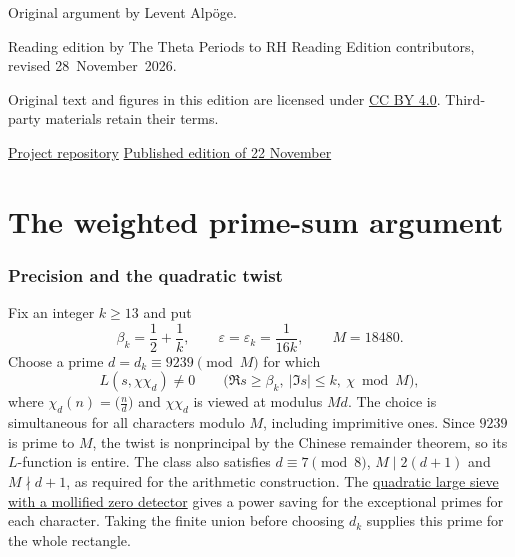 \documentclass[11pt,a4paper]{article}
\DeclareRobustCommand{\teamanchor}[1]{%
  \ifmmode
    \hbox{\hypertarget{#1}{}}%
  \else
    \ifvmode
      \AddToHookNext{para/begin}{\hypertarget{#1}{}}%
    \else
      \hypertarget{#1}{}%
    \fi
  \fi
}
\begin{document}
\vfill
\noindent{\color{RuleGrey}\rule{\linewidth}{.4pt}}\par
\vspace{.3em}
{\small
\noindent Original argument by Levent Alp\"oge.\par
\noindent Reading edition by The Theta Periods to RH Reading Edition
contributors, revised 28~November~2026.\par
\noindent Original text and figures in this edition are licensed under
\href{https://creativecommons.org/licenses/by/4.0/}{CC BY 4.0}.
Third-party materials retain their terms.\par
\noindent
\href{https://github.com/adjoint-functor/theta-periods-to-rh-reader}{Project repository}\quad
\href{https://github.com/adjoint-functor/theta-periods-to-rh-reader/tree/v2026.11.22}{Published edition of 22 November}\par}

\clearpage
\setcounter{tocdepth}{2}
{\small\tableofcontents\par}

\clearpage
\part{The weighted prime-sum argument}

\section*{Precision and the quadratic twist}
\teamanchor{proof.weighted-twist}%
Fix an integer \(k\ge13\) and put
\[
  \beta_k=\frac12+\frac1k,\qquad
  \varepsilon=\varepsilon_k=\frac{1}{16k},\qquad M=18480.
\]
Choose a prime \(d=d_k\equiv9239\pmod M\) for which
\[
  L(s,\chi\chi_d)\ne0
  \qquad
  \bigl(\Re s\ge\beta_k,\ |\Im s|\le k,\ \chi\bmod M\bigr),
\]
where \(\chi_d(n)=\bigl(\frac nd\bigr)\) and \(\chi\chi_d\) is viewed
at modulus \(Md\). The choice is simultaneous for all characters
modulo \(M\), including imprimitive ones. Since \(9239\) is prime to
\(M\), the twist is nonprincipal by the Chinese remainder theorem, so
its \(L\)-function is entire. The class also satisfies
\(d\equiv7\pmod8\), \(M\mid2(d+1)\) and \(M\nmid d+1\), as required
for the arithmetic construction.
The \hyperlink{proof.weighted-twist-exceptions}{quadratic large sieve with
a mollified zero detector} gives a power saving for the exceptional
primes for each character. Taking the finite union before choosing
\(d_k\) supplies this prime for the whole rectangle.
\end{document}
